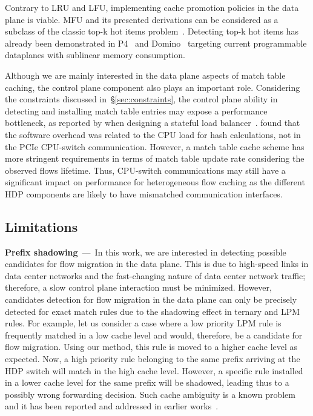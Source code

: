 Contrary to LRU and LFU, implementing cache promotion policies in the data plane is viable.
MFU and its presented derivations can be considered as a subclass of the classic top-k hot items problem~\cite{Metwally:2005}.
Detecting top-k hot items has already been demonstrated in P4~\cite{Sivaraman:17} and Domino~\cite{SivaramanDomino:2016} targeting current programmable dataplanes with sublinear memory consumption.

Although we are mainly interested in the data plane aspects of match table caching, the control plane component also plays an important role.
Considering the constraints discussed in~\S\ref{sec:constraints}, the control plane ability in detecting and installing match table entries may expose a performance bottleneck, as reported by \citeauthor{Miao:2017} when designing a stateful load balancer~\cite{Miao:2017}.
\citeauthor{Miao:2017} found that the software overhead was related to the CPU load for hash calculations, not in the PCIe CPU-switch communication.
However, a match table cache scheme has more stringent requirements in terms of match table update rate considering the observed flows lifetime.
Thus, CPU-switch communications may still have a significant impact on performance for heterogeneous flow caching as the different HDP components are likely to have mismatched communication interfaces.

\subsection{Limitations}\label{sec:method:limitations}

\textbf{Prefix shadowing}~---~In this work, we are interested in detecting possible candidates for flow migration in the data plane.
This is due to high-speed links in data center networks and the fast-changing nature of data center network traffic; therefore, a slow control plane interaction must be minimized.
However, candidates detection for flow migration in the data plane can only be precisely detected for exact match rules due to the shadowing effect in ternary and LPM rules.
For example, let us consider a case where a low priority LPM rule is frequently matched in a low cache level and would, therefore, be a candidate for flow migration.
Using our method, this rule is moved to a higher cache level as expected.
Now, a high priority rule belonging to the same prefix arriving at the HDP switch will match in the high cache level.
However, a specific rule installed in a lower cache level for the same prefix will be shadowed, leading thus to a possibly wrong forwarding decision.   
Such cache ambiguity is a known problem and it has been reported and addressed in earlier works~\cite{Degermark:1997, Katta:2014}.

